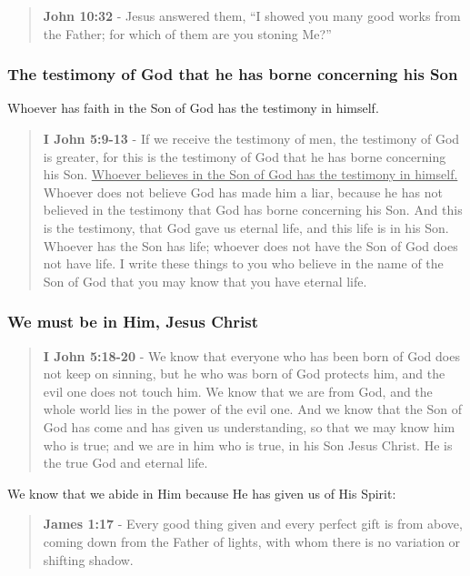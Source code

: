 \documentclass[11pt]{article}
\begin{document}
\begin{quote}
\textbf{John 10:32} - Jesus answered them, “I showed you many good works from the Father; for which of them are you stoning Me?”
\end{quote}

\subsubsection{The testimony of God that he has borne concerning his Son}
\label{sec:org52a6532}
Whoever has faith in the Son of God has the testimony in himself.

\begin{quote}
\textbf{I John 5:9-13} - If we receive the testimony of men, the testimony of God is greater, for this is the testimony of God that he has borne concerning his Son. \uline{Whoever believes in the Son of God has the testimony in himself.} Whoever does not believe God has made him a liar, because he has not believed in the testimony that God has borne concerning his Son. And this is the testimony, that God gave us eternal life, and this life is in his Son. Whoever has the Son has life; whoever does not have the Son of God does not have life. I write these things to you who believe in the name of the Son of God that you may know that you have eternal life.
\end{quote}

\subsubsection{We must be in Him, Jesus Christ}
\label{sec:org40bf2be}
\begin{quote}
\textbf{I John 5:18-20} - We know that everyone who has been born of God does not keep on sinning, but he who was born of God protects him, and the evil one does not touch him. We know that we are from God, and the whole world lies in the power of the evil one. And we know that the Son of God has come and has given us understanding, so that we may know him who is true; and we are in him who is true, in his Son Jesus Christ. He is the true God and eternal life.
\end{quote}

We know that we abide in Him because He has given us of His Spirit:

\begin{quote}
\textbf{James 1:17} - Every good thing given and every perfect gift is from above, coming down from the Father of lights, with whom there is no variation or shifting shadow.
\end{quote}
\end{document}

